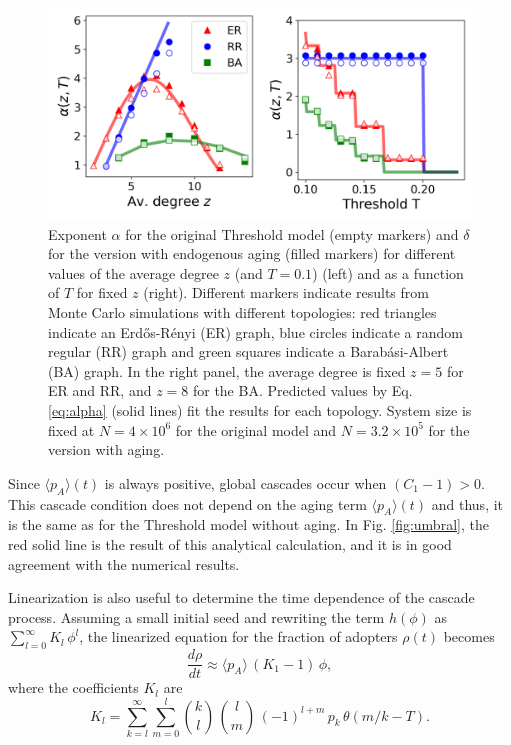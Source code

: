 \begin{figure}
    \includegraphics[width=\columnwidth]{Figs/Aging_Threshold/ENDO.pdf}
    \caption{\label{fig:endo_exp}  Exponent $\alpha$ for the original Threshold model (empty markers) and $\delta$ for the version with endogenous aging (filled markers) for different values of the average degree $z$ (and $T = 0.1$) (left) and as a function of $T$ for fixed $z$ (right). Different markers indicate results from Monte Carlo simulations with different topologies: red triangles indicate an Erd\H{o}s-R\'enyi (ER) graph, blue circles indicate a random regular (RR) graph and green squares indicate a Barab\'asi-Albert (BA) graph. In the right panel, the average degree is fixed $z = 5$ for ER and RR, and $z = 8$ for the BA. Predicted values by Eq. \eqref{eq:alpha} (solid lines) fit the results for each topology. System size is fixed at $N = 4 \times 10^6$ for the original model and $N = 3.2 \times 10^5$ for the version with aging.}
\end{figure}

Since $\langle p_A \rangle(t)$ is always positive, global cascades occur when $( C_1 - 1) > 0 $. This cascade condition does not depend on the aging term $\langle p_A \rangle(t)$ and thus, it is the same as for the Threshold model without aging. In Fig. \ref{fig:umbral}, the red solid line is the result of this analytical calculation, and it is in good agreement with the numerical results. 


Linearization is also useful to determine the time dependence of the cascade process.  Assuming a small initial seed and rewriting the term $h(\phi)$ as  $ \sum_{l=0}^{\infty} K_l\,  \phi^l $, the linearized equation for the fraction of adopters $\rho(t)$ becomes
\begin{equation}
    \label{eq:linear_r}
    \frac{d \rho}{dt} \approx  \langle p_A \rangle\,  ( K_1 -1)\, \phi,
\end{equation}
where the coefficients $K_l$ are
\begin{equation}
    \label{eq:coef_rho}
    K_l = \sum_{k=l}^{\infty} \sum_{m=0}^{l} { k \choose l} \, {l \choose m} \, (-1)^{l+m}\,  p_k \, \theta\left( m/k - T \right).
\end{equation}

